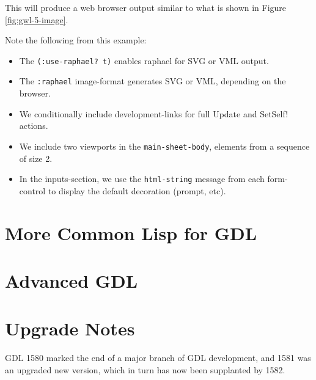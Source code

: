 \documentclass [11pt]{book}
\begin{document}
This will produce a web browser output similar to what is shown in Figure 
\ref{fig:gwl-5-image}.



Note the following from this example:

\begin{itemize}

\item The \texttt{(:use-raphael? t)} enables raphael for SVG or VML output.

\item The \texttt{:raphael} image-format generates SVG or VML, depending on the browser.

\item We conditionally include development-links for full Update and SetSelf! actions.

\item We include two viewports in the \texttt{main-sheet-body}, elements from a sequence of size 2.

\item In the inputs-section, we use
                  the \texttt{html-string} message from each
                  form-control to display the default
                  decoration (prompt, etc).

\end{itemize}





\chapter{More Common Lisp for GDL}

\label{chap:morecommonlispforgdl}



\chapter{Advanced GDL}

\label{chap:advancedgdl}



\chapter*{Upgrade Notes}

\label{chap:upgradenotes}

GDL 1580 marked the end of a major branch of GDL development,
and 1581 was an upgraded new version, which in turn has now been
supplanted by 1582.
\end{document}
